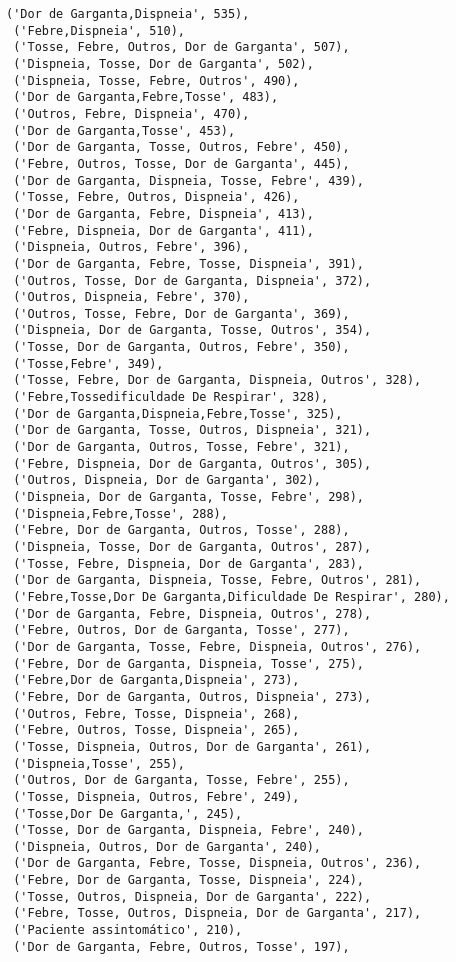 \documentclass[11pt]{article}
\begin{document}
\begin{tcolorbox}[breakable, size=fbox, boxrule=.5pt, pad at break*=1mm, opacityfill=0]
\begin{Verbatim}[commandchars=\\\{\}]
 ('Dor de Garganta,Dispneia', 535),
 ('Febre,Dispneia', 510),
 ('Tosse, Febre, Outros, Dor de Garganta', 507),
 ('Dispneia, Tosse, Dor de Garganta', 502),
 ('Dispneia, Tosse, Febre, Outros', 490),
 ('Dor de Garganta,Febre,Tosse', 483),
 ('Outros, Febre, Dispneia', 470),
 ('Dor de Garganta,Tosse', 453),
 ('Dor de Garganta, Tosse, Outros, Febre', 450),
 ('Febre, Outros, Tosse, Dor de Garganta', 445),
 ('Dor de Garganta, Dispneia, Tosse, Febre', 439),
 ('Tosse, Febre, Outros, Dispneia', 426),
 ('Dor de Garganta, Febre, Dispneia', 413),
 ('Febre, Dispneia, Dor de Garganta', 411),
 ('Dispneia, Outros, Febre', 396),
 ('Dor de Garganta, Febre, Tosse, Dispneia', 391),
 ('Outros, Tosse, Dor de Garganta, Dispneia', 372),
 ('Outros, Dispneia, Febre', 370),
 ('Outros, Tosse, Febre, Dor de Garganta', 369),
 ('Dispneia, Dor de Garganta, Tosse, Outros', 354),
 ('Tosse, Dor de Garganta, Outros, Febre', 350),
 ('Tosse,Febre', 349),
 ('Tosse, Febre, Dor de Garganta, Dispneia, Outros', 328),
 ('Febre,Tossedificuldade De Respirar', 328),
 ('Dor de Garganta,Dispneia,Febre,Tosse', 325),
 ('Dor de Garganta, Tosse, Outros, Dispneia', 321),
 ('Dor de Garganta, Outros, Tosse, Febre', 321),
 ('Febre, Dispneia, Dor de Garganta, Outros', 305),
 ('Outros, Dispneia, Dor de Garganta', 302),
 ('Dispneia, Dor de Garganta, Tosse, Febre', 298),
 ('Dispneia,Febre,Tosse', 288),
 ('Febre, Dor de Garganta, Outros, Tosse', 288),
 ('Dispneia, Tosse, Dor de Garganta, Outros', 287),
 ('Tosse, Febre, Dispneia, Dor de Garganta', 283),
 ('Dor de Garganta, Dispneia, Tosse, Febre, Outros', 281),
 ('Febre,Tosse,Dor De Garganta,Dificuldade De Respirar', 280),
 ('Dor de Garganta, Febre, Dispneia, Outros', 278),
 ('Febre, Outros, Dor de Garganta, Tosse', 277),
 ('Dor de Garganta, Tosse, Febre, Dispneia, Outros', 276),
 ('Febre, Dor de Garganta, Dispneia, Tosse', 275),
 ('Febre,Dor de Garganta,Dispneia', 273),
 ('Febre, Dor de Garganta, Outros, Dispneia', 273),
 ('Outros, Febre, Tosse, Dispneia', 268),
 ('Febre, Outros, Tosse, Dispneia', 265),
 ('Tosse, Dispneia, Outros, Dor de Garganta', 261),
 ('Dispneia,Tosse', 255),
 ('Outros, Dor de Garganta, Tosse, Febre', 255),
 ('Tosse, Dispneia, Outros, Febre', 249),
 ('Tosse,Dor De Garganta,', 245),
 ('Tosse, Dor de Garganta, Dispneia, Febre', 240),
 ('Dispneia, Outros, Dor de Garganta', 240),
 ('Dor de Garganta, Febre, Tosse, Dispneia, Outros', 236),
 ('Febre, Dor de Garganta, Tosse, Dispneia', 224),
 ('Tosse, Outros, Dispneia, Dor de Garganta', 222),
 ('Febre, Tosse, Outros, Dispneia, Dor de Garganta', 217),
 ('Paciente assintomático', 210),
 ('Dor de Garganta, Febre, Outros, Tosse', 197),

\end{Verbatim}
\end{tcolorbox}
\end{document}
